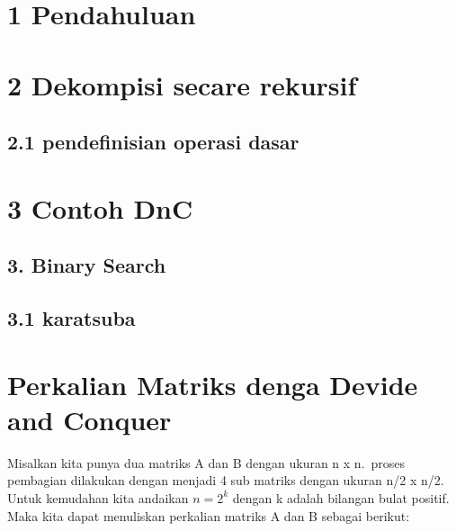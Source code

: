 \documentclass[
  letterpaper,
  DIV=11,
  numbers=noendperiod]{scrartcl}
\author{}
\date{}
\begin{document}
\ifdefined\Shaded\renewenvironment{Shaded}{\begin{tcolorbox}[borderline west={3pt}{0pt}{shadecolor}, interior hidden, boxrule=0pt, enhanced, sharp corners, breakable, frame hidden]}{\end{tcolorbox}}\fi

\hypertarget{pendahuluan}{%
\section{1 Pendahuluan}\label{pendahuluan}}

\hypertarget{dekompisi-secare-rekursif}{%
\section{2 Dekompisi secare rekursif}\label{dekompisi-secare-rekursif}}

\hypertarget{pendefinisian-operasi-dasar}{%
\subsection{2.1 pendefinisian operasi
dasar}\label{pendefinisian-operasi-dasar}}

\hypertarget{contoh-dnc}{%
\section{3 Contoh DnC}\label{contoh-dnc}}

\hypertarget{binary-search}{%
\subsection{3. Binary Search}\label{binary-search}}

\hypertarget{karatsuba}{%
\subsection{3.1 karatsuba}\label{karatsuba}}

\hypertarget{perkalian-matriks-denga-devide-and-conquer}{%
\section{Perkalian Matriks denga Devide and
Conquer}\label{perkalian-matriks-denga-devide-and-conquer}}

Misalkan kita punya dua matriks A dan B dengan ukuran n x n.~proses
pembagian dilakukan dengan menjadi 4 sub matriks dengan ukuran n/2 x
n/2. Untuk kemudahan kita andaikan \(n = 2^k\) dengan k adalah bilangan
bulat positif. Maka kita dapat menuliskan perkalian matriks A dan B
sebagai berikut:
\end{document}
